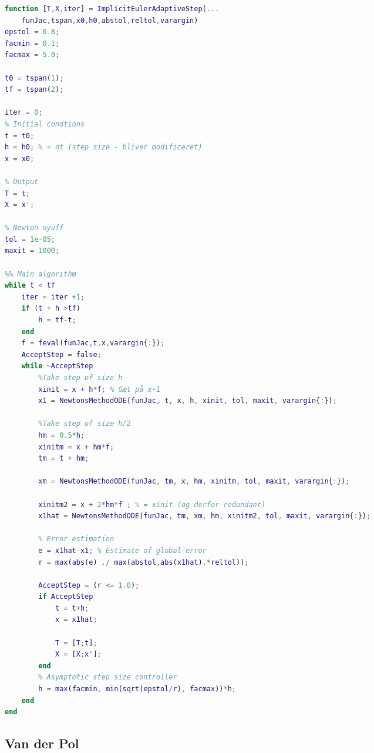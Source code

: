 \begin{adjustwidth*}{0cm}{-0.4cm}
\begin{lstlisting}[frame=single, language=Matlab,caption=Implicit Euler (adaptive step size), label=ExplicitEulerFixie]
function [T,X,iter] = ImplicitEulerAdaptiveStep(...
    funJac,tspan,x0,h0,abstol,reltol,varargin)
epstol = 0.8;
facmin = 0.1;
facmax = 5.0;

t0 = tspan(1);
tf = tspan(2);

iter = 0;
% Initial condtions
t = t0;
h = h0; % = dt (step size - bliver modificeret)
x = x0;

% Output
T = t;
X = x';

% Newton syuff
tol = 1e-05;
maxit = 1000;

%% Main algorithm
while t < tf
    iter = iter +1;
    if (t + h >tf)
        h = tf-t;
    end
    f = feval(funJac,t,x,varargin{:});
    AcceptStep = false;
    while ~AcceptStep
        %Take step of size h
        xinit = x + h*f; % Gæt på x+1
        x1 = NewtonsMethodODE(funJac, t, x, h, xinit, tol, maxit, varargin{:});

        %Take step of size h/2
        hm = 0.5*h;
        xinitm = x + hm*f;
        tm = t + hm;

        xm = NewtonsMethodODE(funJac, tm, x, hm, xinitm, tol, maxit, varargin{:});
        
        xinitm2 = x + 2*hm*f ; % = xinit (og derfor redundant)
        x1hat = NewtonsMethodODE(funJac, tm, xm, hm, xinitm2, tol, maxit, varargin{:});

        % Error estimation
        e = x1hat-x1; % Estimate of global error
        r = max(abs(e) ./ max(abstol,abs(x1hat).*reltol));

        AcceptStep = (r <= 1.0);
        if AcceptStep
            t = t+h;
            x = x1hat;

            T = [T;t];
            X = [X;x'];
        end
        % Asymptotic step size controller
        h = max(facmin, min(sqrt(epstol/r), facmax))*h;
    end
end
\end{lstlisting}
\end{adjustwidth*}










\subsection{Van der Pol}



